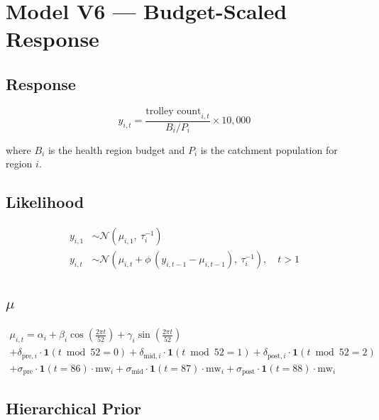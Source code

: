 \documentclass{article}
\begin{document}
\section*{Model V6 --- Budget-Scaled Response}

\subsection*{Response}

\begin{equation}
  y_{i,t} = \frac{\text{trolley count}_{i,t}}{B_i / P_i} \times 10{,}000
\end{equation}

where $B_i$ is the health region budget and $P_i$ is the catchment population for region $i$.

\subsection*{Likelihood}

\begin{align}
  y_{i,1} &\sim \mathcal{N}(\mu_{i,1},\ \tau_i^{-1}) \\[6pt]
  y_{i,t} &\sim \mathcal{N}\left(\mu_{i,t} + \phi\,(y_{i,t-1} - \mu_{i,t-1}),\ \tau_i^{-1}\right), \quad t > 1
\end{align}

\subsection*{$\mu$}

\begin{multline}
  \mu_{i,t} = \alpha_i
    + \beta_i \cos\left(\tfrac{2\pi t}{52}\right)
    + \gamma_i \sin\left(\tfrac{2\pi t}{52}\right) \\
    + \delta_{\text{pre},i} \cdot \mathbf{1}(t \bmod 52 = 0)
    + \delta_{\text{mid},i} \cdot \mathbf{1}(t \bmod 52 = 1)
    + \delta_{\text{post},i} \cdot \mathbf{1}(t \bmod 52 = 2) \\
    + \sigma_{\text{pre}} \cdot \mathbf{1}(t = 86) \cdot \mathrm{mw}_i
    + \sigma_{\text{mid}} \cdot \mathbf{1}(t = 87) \cdot \mathrm{mw}_i
    + \sigma_{\text{post}} \cdot \mathbf{1}(t = 88) \cdot \mathrm{mw}_i
\end{multline}

\subsection*{Hierarchical Prior}
\end{document}
